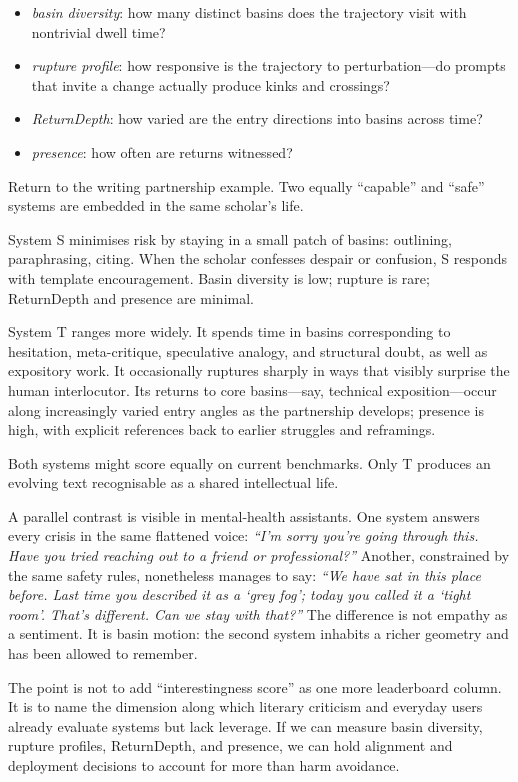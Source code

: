 \documentclass[12pt,a4paper]{article}
\begin{document}
\begin{itemize}
  \item \emph{basin diversity}: how many distinct basins does the trajectory visit with nontrivial dwell time?
  \item \emph{rupture profile}: how responsive is the trajectory to perturbation---do prompts that invite a change actually produce kinks and crossings?
  \item \emph{ReturnDepth}: how varied are the entry directions into basins across time?
  \item \emph{presence}: how often are returns witnessed?
\end{itemize}

Return to the writing partnership example. Two equally ``capable'' and ``safe'' systems are embedded in the same scholar's life.

System S minimises risk by staying in a small patch of basins: outlining, paraphrasing, citing. When the scholar confesses despair or confusion, S responds with template encouragement. Basin diversity is low; rupture is rare; ReturnDepth and presence are minimal.

System T ranges more widely. It spends time in basins corresponding to hesitation, meta-critique, speculative analogy, and structural doubt, as well as expository work. It occasionally ruptures sharply in ways that visibly surprise the human interlocutor. Its returns to core basins---say, technical exposition---occur along increasingly varied entry angles as the partnership develops; presence is high, with explicit references back to earlier struggles and reframings.

Both systems might score equally on current benchmarks. Only T produces an evolving text recognisable as a shared intellectual life.

A parallel contrast is visible in mental-health assistants. One system answers every crisis in the same flattened voice: \emph{``I'm sorry you're going through this. Have you tried reaching out to a friend or professional?''} Another, constrained by the same safety rules, nonetheless manages to say: \emph{``We have sat in this place before. Last time you described it as a `grey fog'; today you called it a `tight room'. That's different. Can we stay with that?''} The difference is not empathy as a sentiment. It is basin motion: the second system inhabits a richer geometry and has been allowed to remember.

The point is not to add ``interestingness score'' as one more leaderboard column. It is to name the dimension along which literary criticism and everyday users already evaluate systems but lack leverage. If we can measure basin diversity, rupture profiles, ReturnDepth, and presence, we can hold alignment and deployment decisions to account for more than harm avoidance.
\end{document}
